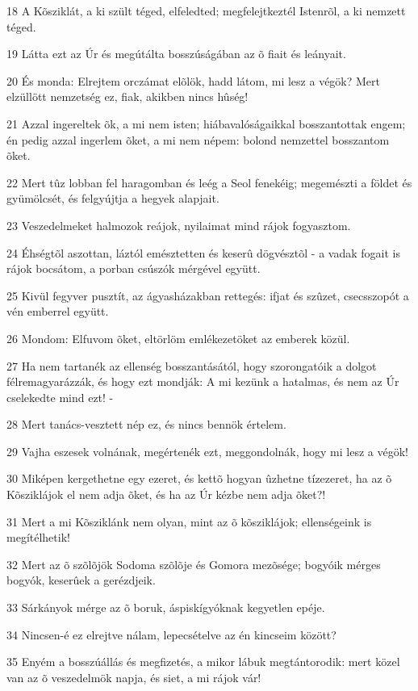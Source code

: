 \par 18 A Kõsziklát, a ki szült téged, elfeledted; megfelejtkeztél Istenrõl, a ki nemzett téged.
\par 19 Látta ezt az Úr és megútálta bosszúságában az õ fiait és leányait.
\par 20 És monda: Elrejtem orczámat elõlök, hadd látom, mi lesz a végök? Mert elzüllött nemzetség ez, fiak, akikben nincs hûség!
\par 21 Azzal ingereltek õk, a mi nem isten; hiábavalóságaikkal bosszantottak engem; én pedig azzal ingerlem õket, a mi nem népem: bolond nemzettel  bosszantom õket.
\par 22 Mert tûz lobban fel haragomban és leég a Seol fenekéig; megemészti a földet és gyümölcsét, és felgyújtja a hegyek alapjait.
\par 23 Veszedelmeket halmozok reájok, nyilaimat mind rájok fogyasztom.
\par 24 Éhségtõl aszottan, láztól emésztetten és keserû dögvésztõl - a vadak fogait is rájok bocsátom, a porban csúszók mérgével együtt.
\par 25 Kivül fegyver pusztít, az ágyasházakban rettegés: ifjat és szûzet, csecsszopót a vén emberrel együtt.
\par 26 Mondom: Elfuvom õket, eltörlöm emlékezetöket az emberek közül.
\par 27 Ha nem tartanék az ellenség bosszantásától, hogy szorongatóik a dolgot félremagyarázzák, és hogy ezt mondják: A mi kezünk a hatalmas, és nem az Úr cselekedte mind ezt! -
\par 28 Mert tanács-vesztett nép ez, és nincs bennök értelem.
\par 29 Vajha eszesek volnának, megértenék ezt, meggondolnák, hogy mi lesz a végök!
\par 30 Miképen kergethetne egy ezeret, és kettõ hogyan ûzhetne tízezeret, ha az õ  Kõsziklájok el nem adja õket, és ha az Úr kézbe nem adja õket?!
\par 31 Mert a mi Kõsziklánk nem olyan, mint az õ kõsziklájok; ellenségeink is megítélhetik!
\par 32 Mert az õ szõlõjök Sodoma szõlõje és Gomora mezõsége; bogyóik mérges bogyók, keserûek a gerézdjeik.
\par 33 Sárkányok mérge az õ boruk, áspiskígyóknak kegyetlen epéje.
\par 34 Nincsen-é ez elrejtve nálam, lepecsételve az én kincseim között?
\par 35 Enyém a bosszúállás és megfizetés, a mikor lábuk megtántorodik: mert közel van az õ veszedelmök napja, és siet, a mi rájok vár!

